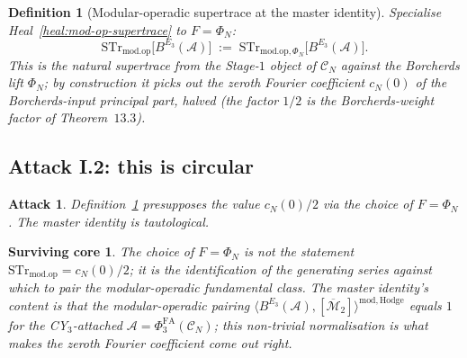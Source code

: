 \documentclass[11pt]{amsart}
\newtheorem{definition}[theorem]{Definition}
\newtheorem{attack}[theorem]{Attack}
\newtheorem{surviving}[theorem]{Surviving core}
\providecommand{\cC}{\mathcal{C}}
\providecommand{\cA}{\mathcal{A}}
\providecommand{\PhiFA}{\Phi^{\mathrm{FA}}}
\providecommand{\Mbar}{\overline{\mathcal{M}}}
\providecommand{\STr}{\mathrm{STr}}
\providecommand{\modop}{\mathrm{mod.op}}
\begin{document}
\begin{definition}[Modular-operadic supertrace at the master
identity]
\label{def:mod-op-supertrace-master}
Specialise Heal~\ref{heal:mod-op-supertrace} to $F = \Phi_N$:
\[
 \STr_{\modop}\bigl[B^{E_3}(\cA)\bigr] \;:=\;
 \STr_{\modop, \Phi_N}\bigl[B^{E_3}(\cA)\bigr].
\]
This is the natural supertrace from the Stage-$1$ object of $\cC_N$
against the Borcherds lift $\Phi_N$; by construction it picks out the
zeroth Fourier coefficient $c_N(0)$ of the Borcherds-input principal
part, halved (the factor $1/2$ is the Borcherds-weight factor of
Theorem~$13.3$).
\end{definition}

\subsection{Attack I.2: this is circular}

\begin{attack}
\label{att:circular}
Definition~\ref{def:mod-op-supertrace-master} presupposes the value
$c_N(0)/2$ via the choice of $F = \Phi_N$. The master identity is
tautological.
\end{attack}

\begin{surviving}
\label{surv:not-circular}
The choice of $F = \Phi_N$ is not the statement $\STr_{\modop} =
c_N(0)/2$; it is the identification of the generating series against
which to pair the modular-operadic fundamental class. The master
identity's content is that the modular-operadic pairing
$\bigl\langle B^{E_3}(\cA), [\Mbar_2] \bigr\rangle^{\mathrm{mod,
Hodge}}$ equals $1$ for the CY$_3$-attached $\cA =
\PhiFA_3(\cC_N)$; this non-trivial normalisation is what makes the
zeroth Fourier coefficient come out right.
\end{surviving}
\end{document}
